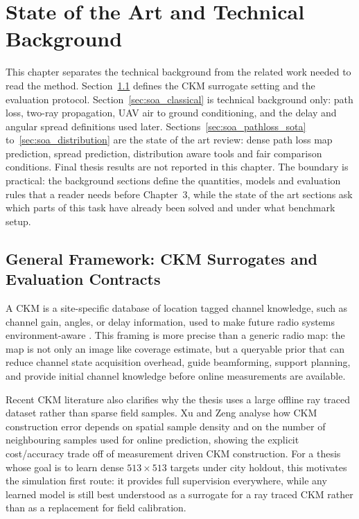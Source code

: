 \chapter[State of the Art]{State of the Art and Technical Background}
\label{chap:soa}

This chapter separates the technical background from the related work needed to
read the method. Section~\ref{sec:soa_ckm_context} defines the CKM surrogate
setting and the evaluation protocol.
Section~\ref{sec:soa_classical} is technical background only: path loss,
two-ray propagation, UAV air to ground conditioning, and the delay and angular
spread definitions used later. Sections~\ref{sec:soa_pathloss_sota}
to~\ref{sec:soa_distribution} are the state of the art review: dense path loss
map prediction, spread prediction, distribution aware tools and fair comparison
conditions. Final thesis results are not reported in this chapter.
The boundary is practical: the background sections define the quantities,
models and evaluation rules that a reader needs before Chapter~3, while the
state of the art sections ask which parts of this task have already been solved
and under what benchmark setup.

\section{General Framework: CKM Surrogates and Evaluation Contracts}
\label{sec:soa_ckm_context}

A CKM is a site-specific database of location tagged channel knowledge, such as
channel gain, angles, or delay information, used to make future radio systems
environment-aware
\cite{zengx2021ckm,ckmtutorial2024}. This framing is more precise than a
generic radio map: the map is not only an image like coverage estimate, but a
queryable prior that can reduce channel state acquisition overhead, guide
beamforming, support planning, and provide initial channel knowledge before
online measurements are available.

Recent CKM literature also clarifies why the thesis uses a large offline
ray traced dataset rather than sparse field samples. Xu and Zeng
\cite{ckmdata2024} analyse how CKM construction error depends on spatial sample
density and on the number of neighbouring samples used for online prediction,
showing the explicit cost/accuracy trade off of measurement driven CKM
construction. For a thesis whose goal is to learn dense \(513\times513\)
targets under city holdout, this motivates the simulation first route: it
provides full supervision everywhere, while any learned model is still best
understood as a surrogate for a ray traced CKM rather than as a replacement for
field calibration.

